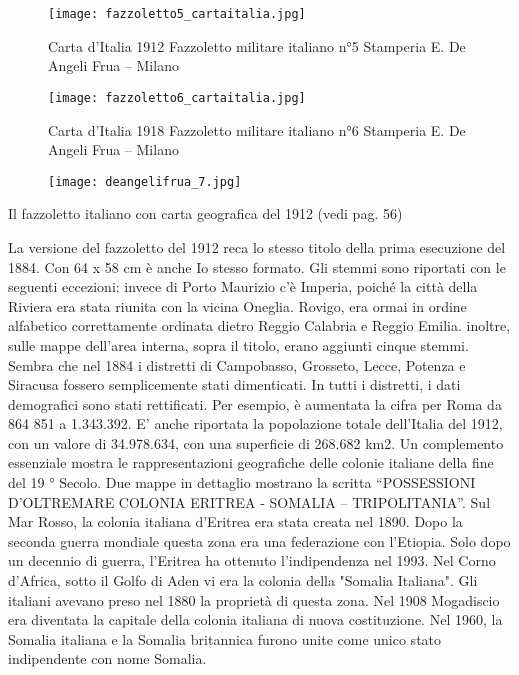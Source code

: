 \begin{figure}[h]
	\centering
		\texttt{[image: fazzoletto5\_cartaitalia.jpg]}
	\caption{Carta d’Italia 1912 Fazzoletto militare italiano n°5 Stamperia E. De Angeli Frua – Milano}
	\label{fig:fazzoletto5_cartaitalia}
\end{figure}

\newpage

\begin{figure}[h]
	\centering
		\texttt{[image: fazzoletto6\_cartaitalia.jpg]}
	\caption{Carta d’Italia 1918 Fazzoletto militare italiano n°6 Stamperia E. De Angeli Frua – Milano}
	\label{fig:fazzoletto6_cartaitalia}
\end{figure}

\newpage

\begin{figure}[h]
	\centering
		\texttt{[image: deangelifrua\_7.jpg]}
	\caption{}
	\label{fig:deangelifrua_7}
\end{figure}

\newpage

Il fazzoletto italiano con carta geografica del 1912 
(vedi pag. 56)
   
La versione del fazzoletto del 1912 reca lo stesso titolo della prima esecuzione del 1884. Con 64 x 58 cm è anche Io stesso formato. Gli stemmi sono riportati con le seguenti eccezioni: invece di Porto Maurizio c'è Imperia, poiché la città della Riviera era stata riunita con la vicina Oneglia. Rovigo, era ormai in ordine alfabetico correttamente ordinata dietro Reggio Calabria e Reggio Emilia. inoltre, sulle mappe dell'area interna, sopra il titolo, erano aggiunti cinque stemmi. Sembra che nel 1884 i distretti di Campobasso, Grosseto, Lecce, Potenza e Siracusa fossero semplicemente stati dimenticati.
   In tutti i distretti, i dati demografici sono stati rettificati. Per esempio, è aumentata la cifra per Roma da 864 851 a 1.343.392. E' anche riportata la popolazione totale dell'Italia del 1912, con un valore di 34.978.634, con una superficie di 268.682 km2.
   Un complemento essenziale mostra le rappresentazioni geografiche delle colonie italiane della fine del 19 ° Secolo. Due mappe in dettaglio mostrano la scritta “POSSESSIONI D'OLTREMARE COLONIA ERITREA - SOMALIA – TRIPOLITANIA”. Sul Mar Rosso, la colonia italiana d'Eritrea era stata creata nel 1890. 
   Dopo la seconda guerra mondiale questa zona era una federazione con l'Etiopia. Solo dopo un decennio di guerra, l'Eritrea ha ottenuto l'indipendenza nel 1993.
   Nel Corno d'Africa, sotto il Golfo di Aden vi era la colonia della "Somalia Italiana". Gli italiani avevano preso nel 1880 la proprietà di questa zona. Nel 1908 Mogadiscio era diventata la capitale della colonia italiana di nuova costituzione. Nel 1960, la Somalia italiana e la Somalia britannica furono unite come unico stato indipendente con nome Somalia.
   
